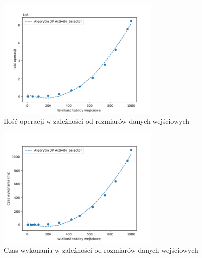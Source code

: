 \documentclass{article}
\begin{document}
\begin{table}[H]
    \centering
    \caption{Liczba operacji i czas wykonania dla iteracyjnej wersji zachłannego algorytmu przy różnych rozmiarach tablicy}
    \label{tab:iterative_activity_selector}
\end{table}
\begin{figure}[H]
    \centering
    \includegraphics[width=0.7\textwidth]{Figure_7.png}
    \caption{Ilość operacji w zależności od rozmiarów danych wejściowych}
    \label{fig:das}
\end{figure}
\begin{figure}[H]
    \centering
    \includegraphics[width=0.7\textwidth]{Figure_9.png}
    \caption{Czas wykonania w zależności od rozmiarów danych wejściowych}
    \label{fig:das}
\end{figure}
\end{document}
